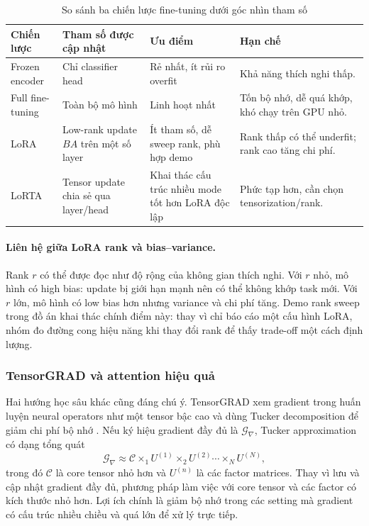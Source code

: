 \begin{table}[H]
\centering
\small
\caption{So sánh ba chiến lược fine-tuning dưới góc nhìn tham số}
\label{tab:fine-tuning-strategies}
\begin{tabular}{L{0.19\textwidth}L{0.28\textwidth}L{0.21\textwidth}L{0.20\textwidth}}
\toprule
\textbf{Chiến lược} & \textbf{Tham số được cập nhật} & \textbf{Ưu điểm} & \textbf{Hạn chế} \\
\midrule
Frozen encoder &
Chỉ classifier head &
Rẻ nhất, ít rủi ro overfit &
Khả năng thích nghi thấp. \\
\addlinespace
Full fine-tuning &
Toàn bộ mô hình &
Linh hoạt nhất &
Tốn bộ nhớ, dễ quá khớp, khó chạy trên GPU nhỏ. \\
\addlinespace
LoRA &
Low-rank update $BA$ trên một số layer &
Ít tham số, dễ sweep rank, phù hợp demo &
Rank thấp có thể underfit; rank cao tăng chi phí. \\
\addlinespace
LoRTA &
Tensor update chia sẻ qua layer/head &
Khai thác cấu trúc nhiều mode tốt hơn LoRA độc lập &
Phức tạp hơn, cần chọn tensorization/rank. \\
\bottomrule
\end{tabular}
\end{table}

\paragraph{Liên hệ giữa LoRA rank và bias--variance.}
Rank $r$ có thể được đọc như độ rộng của không gian thích nghi. Với $r$ nhỏ, mô hình có
high bias: update bị giới hạn mạnh nên có thể không khớp task mới. Với $r$ lớn, mô hình
có low bias hơn nhưng variance và chi phí tăng. Demo rank sweep trong đồ án khai thác
chính điểm này: thay vì chỉ báo cáo một cấu hình LoRA, nhóm đo đường cong hiệu năng khi
thay đổi rank để thấy trade-off một cách định lượng.

\subsubsection{TensorGRAD và attention hiệu quả}

Hai hướng học sâu khác cũng đáng chú ý. TensorGRAD xem gradient trong huấn luyện
neural operators như một tensor bậc cao và dùng Tucker decomposition để giảm chi phí
bộ nhớ \cite{loeschcke2025tensorgrad}. Nếu ký hiệu gradient đầy đủ là
$\mathcal{G}_{\nabla}$, Tucker approximation có dạng tổng quát
\begin{equation}
    \mathcal{G}_{\nabla}
    \approx
    \mathcal{C}
    \times_1 U^{(1)}
    \times_2 U^{(2)}
    \cdots
    \times_N U^{(N)},
    \label{eq:tensorgrad-tucker}
\end{equation}
trong đó $\mathcal{C}$ là core tensor nhỏ hơn và $U^{(n)}$ là các factor matrices. Thay
vì lưu và cập nhật gradient đầy đủ, phương pháp làm việc với core tensor và các factor
có kích thước nhỏ hơn. Lợi ích chính là giảm bộ nhớ trong các setting mà gradient có
cấu trúc nhiều chiều và quá lớn để xử lý trực tiếp.

